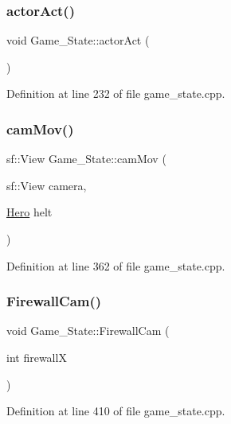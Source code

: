 \subsubsection{\texorpdfstring{actor\+Act()}{actorAct()}}
{\footnotesize\ttfamily void Game\+\_\+\+State\+::actor\+Act (\begin{DoxyParamCaption}{ }\end{DoxyParamCaption})}



Definition at line 232 of file game\+\_\+state.\+cpp.

\hypertarget{class_game___state_a87ce59fa6d8147096bfb835c5a93fc1d}{}\label{class_game___state_a87ce59fa6d8147096bfb835c5a93fc1d} 
\subsubsection{\texorpdfstring{cam\+Mov()}{camMov()}}
{\footnotesize\ttfamily sf\+::\+View Game\+\_\+\+State\+::cam\+Mov (\begin{DoxyParamCaption}\item[{sf\+::\+View}]{camera,  }\item[{\hyperlink{class_hero}{Hero}}]{helt }\end{DoxyParamCaption})}



Definition at line 362 of file game\+\_\+state.\+cpp.

\hypertarget{class_game___state_a122037a320f91a566d07697ea4fa0f39}{}\label{class_game___state_a122037a320f91a566d07697ea4fa0f39} 
\subsubsection{\texorpdfstring{Firewall\+Cam()}{FirewallCam()}}
{\footnotesize\ttfamily void Game\+\_\+\+State\+::\+Firewall\+Cam (\begin{DoxyParamCaption}\item[{int}]{firewallX }\end{DoxyParamCaption})}



Definition at line 410 of file game\+\_\+state.\+cpp.

\hypertarget{class_game___state_a828b93b20d67bb6bdb1d15cd538157f5}{}\label{class_game___state_a828b93b20d67bb6bdb1d15cd538157f5} 
